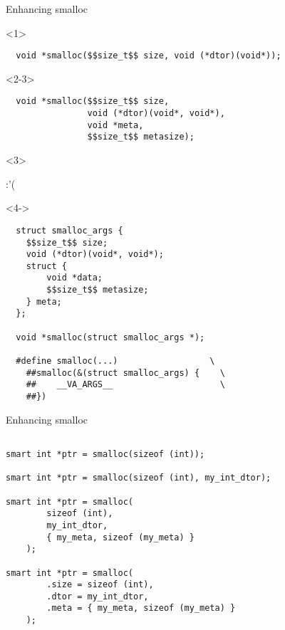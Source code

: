 \documentclass[10pt]{beamer}
\begin{document}
\begin{frame}[fragile]{Enhancing smalloc}

  \begin{onlyenv}<1>
    \begin{lstlisting}
  void *smalloc($$size_t$$ size, void (*dtor)(void*));
    \end{lstlisting}
  \end{onlyenv}

  \begin{onlyenv}<2-3>
    \begin{lstlisting}
  void *smalloc($$size_t$$ size,
                void (*dtor)(void*, void*),
                void *meta,
                $$size_t$$ metasize);
    \end{lstlisting}
  \end{onlyenv}

  \begin{onlyenv}<3>
    \begin{center}
      \Huge:'(\normalsize
    \end{center}
  \end{onlyenv}

  \begin{onlyenv}<4->

    \begin{lstlisting}
  struct smalloc_args {
    $$size_t$$ size;
    void (*dtor)(void*, void*);
    struct {
        void *data;
        $$size_t$$ metasize;
    } meta;
  };

  void *smalloc(struct smalloc_args *);

  #define smalloc(...)                  \
    ##smalloc(&(struct smalloc_args) {    \
    ##    __VA_ARGS__                     \
    ##})
    \end{lstlisting}

  \end{onlyenv}

\end{frame}

\begin{frame}[fragile]{Enhancing smalloc}

    \begin{lstlisting}

smart int *ptr = smalloc(sizeof (int));

smart int *ptr = smalloc(sizeof (int), my_int_dtor);

smart int *ptr = smalloc(
        sizeof (int),
        my_int_dtor,
        { my_meta, sizeof (my_meta) }
    );

smart int *ptr = smalloc(
        .size = sizeof (int),
        .dtor = my_int_dtor,
        .meta = { my_meta, sizeof (my_meta) }
    );
    \end{lstlisting}

\end{frame}
\end{document}
